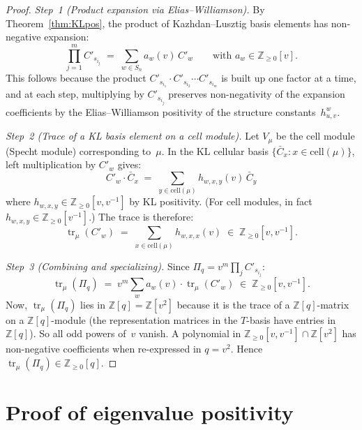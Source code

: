 \documentclass[11pt]{article}
\theoremstyle{definition}
\theoremstyle{remark}
\begin{document}
\begin{proof}
\emph{Step~1 (Product expansion via Elias--Williamson).}
By Theorem~\ref{thm:KLpos}, the product of
Kazhdan--Lusztig basis elements has non-negative expansion:
\[
  \prod_{j=1}^m C'_{s_{i_j}}
  \;=\; \sum_{w \in S_n} a_w(v)\, C'_w
  \qquad\text{with } a_w \in \mathbb{Z}_{\geq 0}[v].
\]
This follows because the product $C'_{s_{i_1}} \cdot C'_{s_{i_2}}
\cdots C'_{s_{i_m}}$ is built up one factor at a time, and at each
step, multiplying by $C'_{s_{i_j}}$ preserves non-negativity of the
expansion coefficients by the Elias--Williamson positivity of the
structure constants~$h^w_{u,v}$.

\emph{Step~2 (Trace of a KL basis element on a cell module).}
Let $V_\mu$ be the cell module (Specht module) corresponding to~$\mu$.
In the KL cellular basis $\{\bar{C}_x : x \in \mathrm{cell}(\mu)\}$,
left multiplication by $C'_w$ gives:
\[
  C'_w \cdot \bar{C}_x
  \;=\; \sum_{y \in \mathrm{cell}(\mu)} h_{w,x,y}(v)\, \bar{C}_y
\]
where $h_{w,x,y} \in \mathbb{Z}_{\geq 0}[v, v^{-1}]$ by KL positivity.
(For cell modules, in fact $h_{w,x,y} \in \mathbb{Z}_{\geq 0}[v^{-1}]$.)
The trace is therefore:
\[
  \operatorname{tr}_\mu(C'_w)
  \;=\; \sum_{x \in \mathrm{cell}(\mu)} h_{w,x,x}(v)
  \;\in\; \mathbb{Z}_{\geq 0}[v, v^{-1}].
\]

\emph{Step~3 (Combining and specializing).}
Since $\Pi_q = v^m \prod_{j} C'_{s_{i_j}}$:
\[
  \operatorname{tr}_\mu(\Pi_q)
  \;=\; v^m \sum_{w} a_w(v) \cdot \operatorname{tr}_\mu(C'_w)
  \;\in\; \mathbb{Z}_{\geq 0}[v, v^{-1}].
\]
Now, $\operatorname{tr}_\mu(\Pi_q)$ lies in $\mathbb{Z}[q] = \mathbb{Z}[v^2]$
because it is the trace of a $\mathbb{Z}[q]$-matrix on a $\mathbb{Z}[q]$-module
(the representation matrices in the $T$-basis have entries in $\mathbb{Z}[q]$).
So all odd powers of~$v$ vanish.
A polynomial in $\mathbb{Z}_{\geq 0}[v, v^{-1}] \cap \mathbb{Z}[v^2]$
has non-negative coefficients when re-expressed in $q = v^2$.
Hence $\operatorname{tr}_\mu(\Pi_q) \in \mathbb{Z}_{\geq 0}[q]$.
\end{proof}

\section{Proof of eigenvalue positivity}
\end{document}
